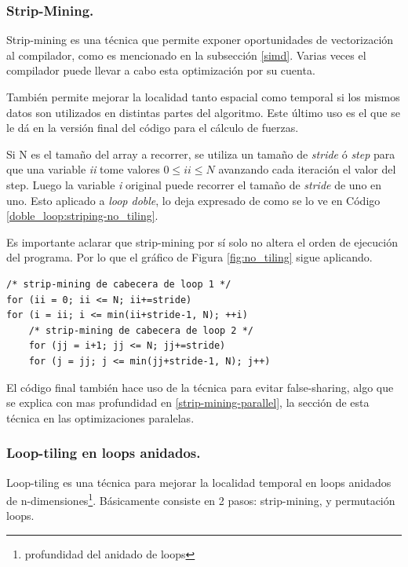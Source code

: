 \documentclass{article}
\begin{document}
\subsubsection{Strip-Mining.\label{strip-mining}}
Strip-mining es una técnica que permite exponer oportunidades de vectorización al compilador, como es mencionado
en la subsección \ref{simd}. Varias veces el compilador puede llevar a cabo esta optimización por su cuenta.


También permite mejorar la localidad tanto espacial como temporal si los mismos datos son utilizados en distintas partes
del algoritmo. Este último uso es el que se le dá en la versión final del código para el cálculo de fuerzas.


Si N es el tamaño del array a recorrer, se utiliza un tamaño de \textit{stride} ó \textit{step} para que una variable \textit{ii}
tome valores $0\leq{ii}\leq N$ avanzando cada iteración el valor del step. Luego la variable \textit{i} original puede recorrer
el tamaño de \textit{stride} de uno en uno. Esto aplicado a \textit{loop doble}, lo deja expresado de como se lo ve en
Código \ref{doble_loop:striping-no_tiling}.

Es importante aclarar que strip-mining por sí solo no altera el orden de ejecución del programa. Por lo
que el gráfico de Figura \ref{fig:no_tiling} sigue aplicando.

\begin{lstlisting}[style=CStyle,label=doble_loop:striping-no_tiling,caption=doble loop con strip-mining en ambos loops.]
/* strip-mining de cabecera de loop 1 */
for (ii = 0; ii <= N; ii+=stride)
for (i = ii; i <= min(ii+stride-1, N); ++i)
	/* strip-mining de cabecera de loop 2 */
	for (jj = i+1; jj <= N; jj+=stride)
	for (j = jj; j <= min(jj+stride-1, N); j++)
\end{lstlisting}


El código final también hace uso de la técnica para evitar false-sharing, algo que se explica con mas profundidad
en \ref{strip-mining-parallel}, la sección de esta técnica en las optimizaciones paralelas.

\subsubsection{Loop-tiling en loops anidados.}

Loop-tiling es una técnica para mejorar la localidad temporal en loops anidados de
n-dimensiones\footnote{profundidad del anidado de loops}. Básicamente consiste en 2 pasos: strip-mining, y permutación loops.
\end{document}

